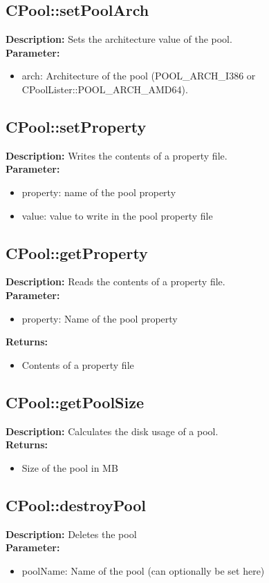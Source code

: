 \subsection{CPool::setPoolArch}
\textbf{Description:} Sets the architecture value of the pool.\\
\textbf{Parameter:}
\begin{itemize}
\item arch: Architecture of the pool (POOL\_ARCH\_I386 or CPoolLister::POOL\_ARCH\_AMD64).
\end{itemize}

\subsection{CPool::setProperty}
\textbf{Description:} Writes the contents of a property file.\\
\textbf{Parameter:}
\begin{itemize}
\item property: name of the pool property
\item value: value to write in the pool property file
\end{itemize}

\subsection{CPool::getProperty}
\textbf{Description:} Reads the contents of a property file.\\
\textbf{Parameter:}
\begin{itemize}
\item property: Name of the pool property
\end{itemize}
\textbf{Returns:}
\begin{itemize}
\item Contents of a property file
\end{itemize}

\subsection{CPool::getPoolSize}
\textbf{Description:} Calculates the disk usage of a pool.\\
\textbf{Returns:}
\begin{itemize}
\item Size of the pool in MB
\end{itemize}

\subsection{CPool::destroyPool}
\textbf{Description:} Deletes the pool\\
\textbf{Parameter:}
\begin{itemize}
\item poolName: Name of the pool (can optionally be set here)
\end{itemize}

